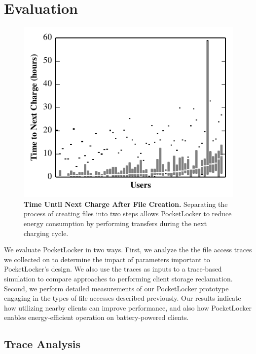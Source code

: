 
\section{Evaluation}
\label{sec-evaluation}

\begin{figure}[t]
  \includegraphics{./figures/pocketlocker/BatteryLengthDistributionGraph.pdf}
  
  \caption{\small \textbf{Time Until Next Charge After File Creation.}
    Separating the process of creating files into two steps allows
  PocketLocker to reduce energy consumption by performing transfers during
the next charging cycle.}
  
  \label{fig-simulation-battery}

  \vspace*{-0.2in}
\end{figure}

We evaluate PocketLocker in two ways. First, we analyze the the file access
traces we collected on \PhoneLab{} to determine the impact of parameters
important to PocketLocker's design. We also use the traces as inputs to a
trace-based simulation to compare approaches to performing client storage
reclamation. Second, we perform detailed measurements of our PocketLocker
prototype engaging in the types of file accesses described previously.
Our results indicate how utilizing nearby clients can improve performance, and
also how PocketLocker enables energy-efficient operation on battery-powered
clients.

\subsection{Trace Analysis}
\label{subsec-evaluation-traces}

